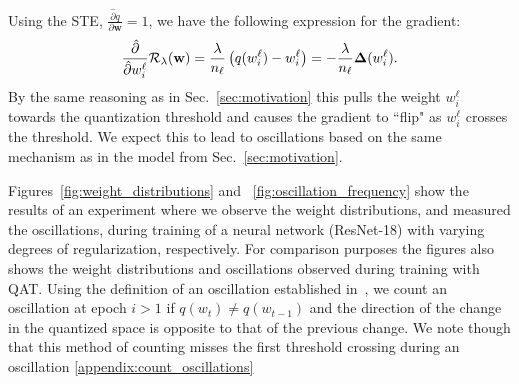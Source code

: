 Using the STE, $\frac{\hat\partial q}{\partial \mathbf{w}}=1$, we have the following expression for the gradient:
\begin{align}
\frac{\hat\partial}{\hat\partial w^\ell_i}\mathcal{R_\lambda}(\mathbf{w}) = \frac{\lambda}{n_\ell} \left( q(w^\ell_{i}) - w^\ell_{i} \right) = -\frac{\lambda}{n_\ell} \mathbf{\Delta}(w_i^\ell).
\end{align}
By the same reasoning as in Sec.~\ref{sec:motivation} this pulls the weight $w_i^\ell$ towards the quantization threshold and causes the gradient to ``flip" as $w_i^\ell$ crosses the threshold. We expect this to lead to oscillations based on the same mechanism as in the model from Sec.~\ref{sec:motivation}. 


Figures~\ref{fig:weight_distributions} and ~\ref{fig:oscillation_frequency} show the results of an experiment where we observe the weight distributions, and measured the oscillations, during training of a neural network (ResNet-18) with varying degrees of regularization, respectively. For comparison purposes the figures also shows the weight distributions and oscillations observed during training with QAT. Using the definition of an oscillation established in~\citet{nagel2022overcoming}, we count an oscillation at epoch \( i > 1\) if $q(w_t) \neq q(w_{t-1})$ and the direction of the change in the quantized space is opposite to that of the previous change. We note though that this method of counting misses the first threshold crossing during an oscillation \ref{appendix:count_oscillations}

